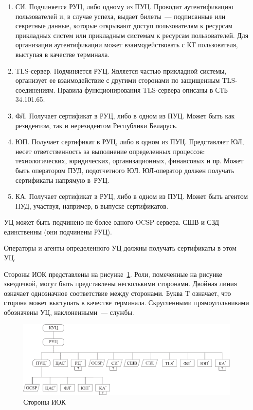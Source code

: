 \begin{enumerate}
\item
СИ. Подчиняется РУЦ, либо одному из ПУЦ.
Проводит аутентификацию пользователей и, в случае успеха, выдает билеты~---
подписанные или секретные данные, которые открывают доступ пользователям к 
ресурсам прикладных систем или прикладным системам к ресурсам пользователей.
Для организации аутентификации может взаимодействовать с КТ пользователя,
выступая в качестве терминала.

\item
TLS-сервер. Подчиняется РУЦ.
Является частью прикладной системы, организует ее взаимодействие 
с другими сторонами по защищенным TLS-соединениям. 
Правила функционирования TLS-сервера описаны в СТБ 34.101.65.

\item
ФЛ. Получает сертификат в РУЦ, либо в одном из ПУЦ.
Может быть как резидентом, так и нерезидентом Республики Беларусь.

\item
ЮП. Получает сертификат в РУЦ, либо в одном из ПУЦ.
%
Представляет ЮЛ, несет ответственность за выполнение определенных 
процессов: технологических, юридических, организационных, финансовых и пр.
%
Может быть оператором ПУД, подотчетного ЮЛ.
ЮЛ-оператор должен получать сертификаты напрямую в~РУЦ.

\item
КА. Получает сертификат в РУЦ, либо в одном из ПУЦ.
%
Может быть агентом ПУД, участвуя, например, в выпуске сертификатов.
\end{enumerate}

УЦ может быть подчинено не более одного OCSP-сервера.
СШВ и СЗД единственны (они подчинены РУЦ). 

Операторы и агенты определенного УЦ должны получать сертификаты в этом УЦ.

Стороны ИОК представлены на рисунке~\ref{Fig.ENTITIES.1}.
Роли, помеченные на рисунке звездочкой, могут быть представлены 
несколькими сторонами. Двойная линия означает однозначное соответствие 
между сторонами. Буква T означает, что сторона может выступать в качестве 
терминала. Скругленными прямоугольниками обозначены УЦ, наклоненными~--- службы.

\begin{figure}[bht]
\begin{center}
\includegraphics[width=17cm]{../figs/entities}
\end{center}
\caption{Стороны ИОК}
\label{Fig.ENTITIES.1}
\end{figure}

